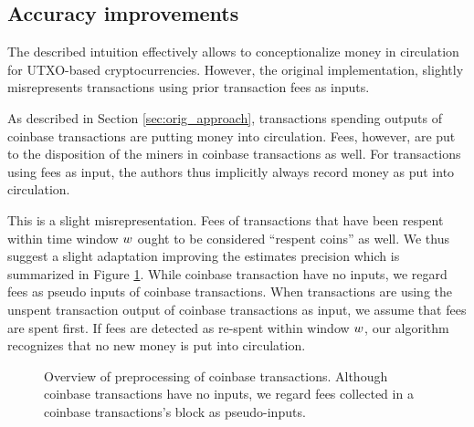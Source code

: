 \subsection{Accuracy improvements}
\label{sec:inaccuracy_fees}%
The described intuition effectively allows to conceptionalize money in circulation for UTXO-based cryptocurrencies. %
However, the original implementation, slightly misrepresents transactions using prior transaction fees as inputs. %

As described in Section \ref{sec:orig_approach}, transactions spending outputs of coinbase transactions are putting money into circulation. %
Fees, however, are put to the disposition of the miners in coinbase transactions as well. %
For transactions using fees as input, the authors thus implicitly always record money as put into circulation. %

% 
% 
%

This is a slight misrepresentation. %
Fees of transactions that have been respent within time window \({w}\) ought to be considered ``respent coins'' as well. %
We thus suggest a slight adaptation improving the estimates precision which is summarized in Figure \ref{fig:improve_fees}. %
While coinbase transaction have no inputs, we regard fees as pseudo inputs of coinbase transactions. %
When transactions are using the unspent transaction output of coinbase transactions as input, we assume that fees are spent first. %
If fees are detected as re-spent within window \({w}\), our algorithm recognizes that no new money is put into circulation. %

\begin{figure}[t]
  \label{fig:improve_fees}%
	
	\centering
	\caption{Overview of preprocessing of coinbase transactions. Although coinbase transactions have no inputs, we regard fees collected in a coinbase transactions's block as pseudo-inputs.}
\end{figure}

